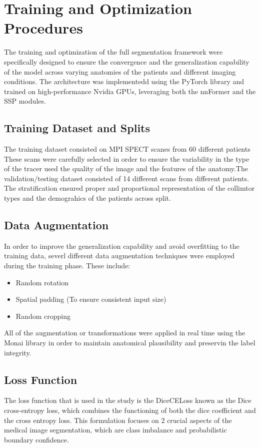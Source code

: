 \section{Training and Optimization Procedures}
The training and optimization of the full segmentation framework were specifically designed to ensure the convergence and the generalization capability of the model across varying anatomies of the patients and different imaging conditions. The architecture was implementedd using the PyTorch library and trained on high-performance Nvidia GPUs, leveraging both the nnFormer and the SSP modules.

\subsection{Training Dataset and Splits}
The training dataset consisted on MPI SPECT scanes from 60 different patients These scans were carefully selected in order to ensure the variability in the type of the tracer used the quality of the image and the features of the anatomy.The validation/testing dataset consisted of 14 different scans from different patients. The stratification ensured proper and proportional representation of the collimtor types and the demograhics of the patients across split.

\subsection{Data Augmentation}
In order to improve the generalization capability and avoid overfitting to the training data, severl different data augmentation techniques were employed during the training phase. These include: 
\begin{itemize}
\item Random rotation \item Spatial padding (To ensure consistent input size) \item Random cropping 
\end{itemize}

All of the augmentation or transformations were applied in real time using the Monai library in order to maintain anatomical plausibility and preservin the label integrity.

\subsection{Loss Function}
The loss function that is used in the study is the DiceCELoss known as the Dice cross-entropy loss, which combines the functioning of both the dice coefficient and the cross entropy loss. This formulation focuses on 2 crucial aspects of the medical image segmentation, which are class imbalance and probabilistic boundary confidence.

